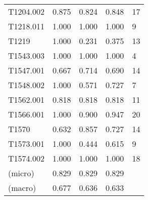 \begin{tabular}{lrrrl}
    T1204.002  & 0.875 & 0.824 & 0.848 & 17  \\
    T1218.011  & 1.000 & 1.000 & 1.000 & 9   \\
    T1219      & 1.000 & 0.231 & 0.375 & 13  \\
    T1543.003  & 1.000 & 1.000 & 1.000 & 4   \\
    T1547.001  & 0.667 & 0.714 & 0.690 & 14  \\
    T1548.002  & 1.000 & 0.571 & 0.727 & 7   \\
    T1562.001  & 0.818 & 0.818 & 0.818 & 11  \\
    T1566.001  & 1.000 & 0.900 & 0.947 & 20  \\
    T1570      & 0.632 & 0.857 & 0.727 & 14  \\
    T1573.001  & 1.000 & 0.444 & 0.615 & 9   \\
    T1574.002  & 1.000 & 1.000 & 1.000 & 18  \\
    (micro)    & 0.829 & 0.829 & 0.829 &     \\
    (macro)    & 0.677 & 0.636 & 0.633 &     \\
    \bottomrule
\end{tabular}
